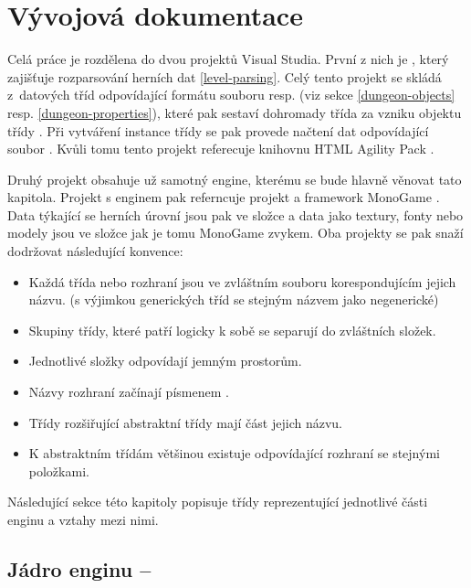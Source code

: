 \chapter{Vývojová dokumentace}
Celá práce je rozdělena do dvou projektů Visual Studia. První z nich je , 
který zajišťuje rozparsování herních dat \vref{level-parsing}. Celý tento projekt se skládá z~datových 
tříd odpovídající formátu souboru  resp.  (viz sekce \ref{dungeon-objects} resp. \ref{dungeon-properties}),
které pak sestaví dohromady třída  za vzniku objektu třídy .
Při vytváření instance třídy  se pak provede načtení dat odpovídající soubor .
Kvůli tomu tento projekt referecuje knihovnu HTML Agility Pack \cite{HtmlAgilityPack}.

Druhý projekt  obsahuje už samotný engine, kterému se bude hlavně věnovat tato kapitola.
Projekt s enginem pak referncuje projekt  a framework MonoGame \cite{MonoGame}.
Data týkající se herních úrovní jsou pak ve složce  a data jako textury, fonty nebo modely jsou ve složce
 jak je tomu MonoGame zvykem.  
Oba projekty se pak snaží dodržovat následující konvence:

\begin{itemize}
\item Každá třída nebo rozhraní jsou ve zvláštním souboru korespondujícím jejich názvu. (s výjimkou generických tříd se stejným názvem jako negenerické)
\item Skupiny třídy, které patří logicky k sobě se separují do zvláštních složek.
\item Jednotlivé složky odpovídají jemným prostorům.
\item Názvy rozhraní začínají písmenem .
\item Třídy rozšiřující abstraktní třídy mají část jejich názvu.
\item K abstraktním třídám většinou existuje odpovídající rozhraní se stejnými položkami.
\end{itemize}

Následující sekce této kapitoly popisuje třídy reprezentující jednotlivé části enginu a vztahy mezi nimi.

\section{Jádro enginu -- }\label{engine-core-section}

